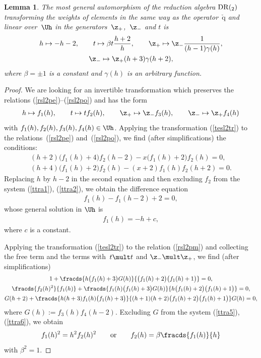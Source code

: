 \documentclass[pdftex]{sigma}
\newtheorem{lem}[theorem]{Lemma}
\def\q{\check{\mathrm q}}\def\Q{\mathrm{Q}}\def\r#1{(\ref{#1})}\let\rf=\r
\numberwithin{equation}{section}
\begin{document}
\begin{lem}
The most general automorphism of the reduction algebra ${\mathrm{DR}}(\sl_2)$ transforming the weights of elements
in the same way as the operator~$\q$ and linear over~$\Uh$ in the genera\-tors~$\z_{+}$,~$\z_{-}$ and $t$ is
\begin{gather}  h\mapsto -h-2  ,\qquad
t\mapsto\beta  t   \frac{h+2}{h} ,\qquad
\z_+\mapsto\z_- \frac{1}{(h-1) \gamma (h)} ,\nonumber\\
\z_-\mapsto   \z_+  (h+3) \gamma (h+2) ,\label{qsl2gen}
\end{gather}
where $\beta =\pm 1$ is a constant and $\gamma (h)$ is an arbitrary function.
\end{lem}

\begin{proof} We are looking for an invertible transformation which preserves the relations \rf{rsl2pe}--\rf{rsl2po} and has the form
\begin{gather}
 h\mapsto f_1(h)  ,\qquad t\mapsto t f_2(h)  ,\qquad \z_+\mapsto\z_-f_3(h)  ,\qquad \z_-\mapsto\z_+f_4(h)\label{tesl2tr}
\end{gather}
with $f_1(h),f_2(h),f_3(h),f_4(h)\in \Uh$. Applying the transformation \rf{tesl2tr} to the relations~\rf{rsl2pe} and~\rf{rsl2po},
we f\/ind (after simplif\/ications) the conditions:
\begin{gather}
(h+2)\bigl( f_1(h)+4\bigr) f_2(h-2)-x\bigl( f_1(h)+2\bigr) f_2(h)=0  ,\label{ttra1}\\
 (h+4)\bigl( f_1(h)+2\bigr) f_2(h)-(x+2) f_1(h) f_2(h+2)=0  .\label{ttra2}
 \end{gather}
Replacing $h$ by $h-2$ in the second equation and then excluding $f_2$ from the system \rf{ttra1}, \rf{ttra2}, we obtain the dif\/ference equation
\begin{gather*} f_1(h)-f_1(h-2)+2=0 ,%
\end{gather*}
whose general solution in $\Uh$ is
\begin{gather}
 f_1(h)=-h+c  ,\label{ttra4}
 \end{gather}
where $c$ is a constant.


Applying the transformation \rf{tesl2tr} to the relation \rf{rsl2pm} and collecting the free term and the terms with~$t\mult t$ and $\z_-\mult\z_+$,
we f\/ind (after simplif\/ications)
\begin{gather}
 1+ \fracds{h\bigl( f_1(h)+3\bigr) G(h)}{\bigl( f_1(h)+2\bigr) \bigl( f_1(h)+1\bigr)}=0 ,\label{ttra5}\\
 \fracds{f_2(h)^2}{f_1(h)}+ \fracds{f_1(h)\bigl( f_1(h)+3\bigr) G(h)}{h\bigl( f_1(h)+2\bigr) \bigl( f_1(h)+1\bigr)}=0 ,\label{ttra6}\\
  G(h+2)+ \fracds{h(h+3)f_1(h)\bigl( f_1(h)+3\bigr)}{(h+1)(h+2)\bigl( f_1(h)+2\bigr) \bigl( f_1(h)+1\bigr)} G(h)=0 ,\label{ttra7}
 \end{gather}
where $G(h):=f_3(h)f_4(h-2)$. Excluding $G$ from the system \rf{ttra5}, \rf{ttra6}, we obtain
\begin{gather}
 f_1(h)^2=h^2  f_2(h)^2\qquad {\mathrm{or}}\qquad f_2(h)=\beta  \fracds{f_1(h)}{h}\label{ttra8}
 \end{gather}
with $\beta^2=1$.



\end{proof}
\end{document}

